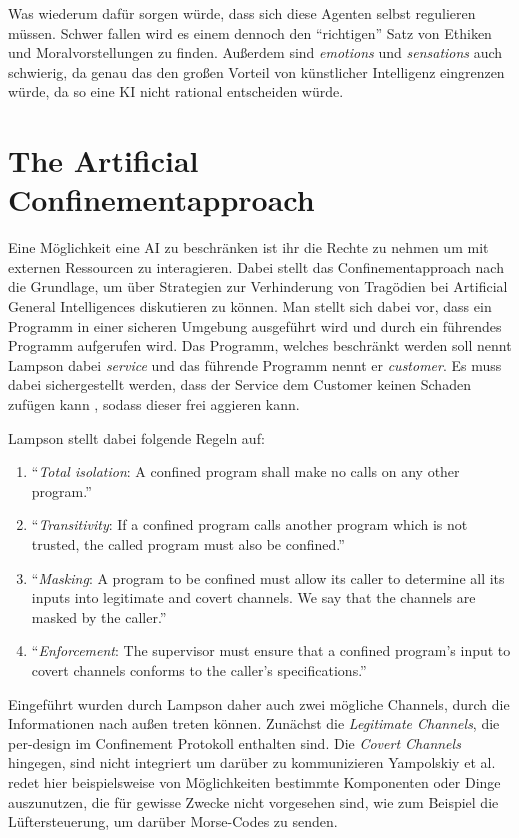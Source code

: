         Was wiederum dafür sorgen würde, dass sich diese Agenten selbst regulieren müssen. Schwer fallen wird es einem
        dennoch den ``richtigen'' Satz von Ethiken und Moralvorstellungen zu finden. Außerdem sind \textit{emotions} und
        \textit{sensations} auch schwierig, da genau das den großen Vorteil von künstlicher Intelligenz eingrenzen würde,
        da so eine KI nicht rational entscheiden würde.

    \section{The Artificial Confinementapproach}

        Eine Möglichkeit eine AI zu beschränken ist ihr die Rechte zu nehmen um mit externen Ressourcen zu interagieren.
        Dabei stellt das Confinementapproach nach \citep{lampson1973note} die Grundlage, um über Strategien zur Verhinderung
        von Tragödien bei Artificial General Intelligences diskutieren zu können. Man stellt sich dabei vor, dass ein Programm
        in einer sicheren Umgebung ausgeführt wird und durch ein führendes Programm aufgerufen wird. Das Programm, welches
        beschränkt werden soll nennt Lampson dabei \textit{service} und das führende Programm nennt er \textit{customer}.
        Es muss dabei sichergestellt werden, dass der Service dem Customer keinen Schaden zufügen kann \cite{lampson1973note},
        sodass dieser frei aggieren kann.

        Lampson stellt dabei folgende Regeln auf:
        \begin{enumerate}
            \item ``\textit{Total isolation}: A confined program shall make no calls on any other program.''
            \item ``\textit{Transitivity}: If a confined program calls another program which is not trusted, the
            called program must also be confined.''
            \item ``\textit{Masking}: A program to be confined must allow its caller to determine all its inputs into
            legitimate and covert channels. We say that the channels are masked by the caller.''
            \item ``\textit{Enforcement}: The supervisor must ensure that a confined program's input to covert
            channels conforms to the caller's specifications.''
        \end{enumerate}

        Eingeführt wurden durch Lampson daher auch zwei mögliche Channels, durch die Informationen nach außen treten
        können.\cite{yampolskiy2012leakproofing} Zunächst die \textit{Legitimate Channels}, die per-design im Confinement
        Protokoll enthalten sind. Die \textit{Covert Channels} hingegen, sind nicht integriert um darüber zu kommunizieren
        Yampolskiy et al. redet hier beispielsweise von Möglichkeiten bestimmte Komponenten oder Dinge auszunutzen, die
        für gewisse Zwecke nicht vorgesehen sind, wie zum Beispiel die Lüftersteuerung, um darüber Morse-Codes zu senden.

